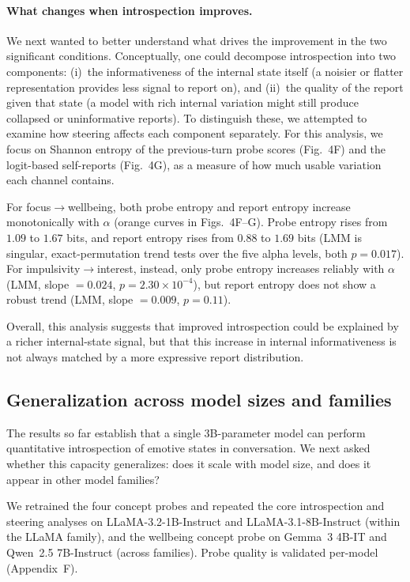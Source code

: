 \documentclass[10pt]{article}
\begin{document}
\paragraph{What changes when introspection improves.}

We next wanted to better understand what drives the improvement in the two significant conditions.
Conceptually, one could decompose introspection into two components: (i)~the informativeness of the internal state itself (a noisier or flatter representation provides less signal to report on), and (ii)~the quality of the report given that state (a model with rich internal variation might still produce collapsed or uninformative reports).
To distinguish these, we attempted to examine how steering affects each component separately.
For this analysis, we focus on Shannon entropy of the previous-turn probe scores (Fig.~4F) and the logit-based self-reports (Fig.~4G), as a measure of how much usable variation each channel contains.

For focus$\to$wellbeing, both probe entropy and report entropy increase monotonically with $\alpha$ (orange curves in Figs.~4F--G).
Probe entropy rises from $1.09$ to $1.67$ bits, and report entropy rises from $0.88$ to $1.69$ bits (LMM is singular, exact-permutation trend tests over the five alpha levels, both $p = 0.017$).
For impulsivity$\to$interest, instead, only probe entropy increases reliably with $\alpha$ (LMM, slope $= 0.024$, $p = 2.30 \times 10^{-4}$), but report entropy does not show a robust trend (LMM, slope $= 0.009$, $p = 0.11$).

Overall, this analysis suggests that improved introspection could be explained by a richer internal-state signal, but that this increase in internal informativeness is not always matched by a more expressive report distribution.

\subsection{Generalization across model sizes and families}
\label{sec:results-generalization}

The results so far establish that a single 3B-parameter model can perform quantitative introspection of emotive states in conversation.
We next asked whether this capacity generalizes: does it scale with model size, and does it appear in other model families?

We retrained the four concept probes and repeated the core introspection and steering analyses on LLaMA-3.2-1B-Instruct and LLaMA-3.1-8B-Instruct (within the LLaMA family), and the wellbeing concept probe on Gemma~3 4B-IT and Qwen~2.5 7B-Instruct (across families).
Probe quality is validated per-model (Appendix~F).
\end{document}
